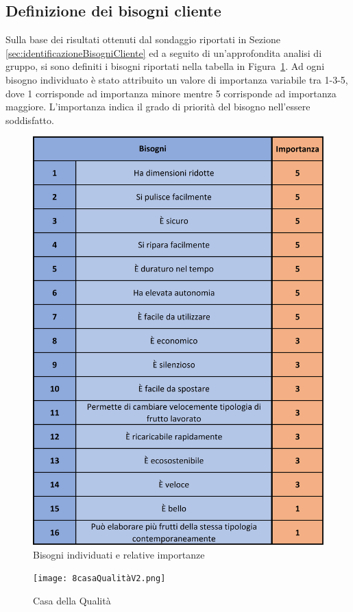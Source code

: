 \documentclass[12pt,a4paper,twoside]{report}  %
\begin{document}
\subsection{Definizione dei bisogni cliente}
Sulla base dei risultati ottenuti dal sondaggio riportati in Sezione \autoref{sec:identificazioneBisogniCliente} ed a seguito di un'approfondita analisi di gruppo, si sono definiti i bisogni riportati nella tabella in Figura~\ref{fig:bisogni}. Ad ogni bisogno individuato è stato attribuito un valore di importanza variabile tra 1-3-5, dove 1 corrisponde ad importanza minore mentre 5 corrisponde ad importanza maggiore. L'importanza indica il grado di priorità del bisogno nell'essere soddisfatto.
\begin{figure}[H] %
    \centering
    \includegraphics[width=0.65\linewidth]{1bisogni.png}
    \caption{Bisogni individuati e relative importanze}
    \label{fig:bisogni}
\end{figure}



\newpage

\begin{landscape}
\begin{figure}
    \centering
    \texttt{[image: 8casaQualitàV2.png]}
    \caption{Casa della Qualità}
    \label{fig:casaQualità}
\end{figure}
\end{landscape}
\end{document}
